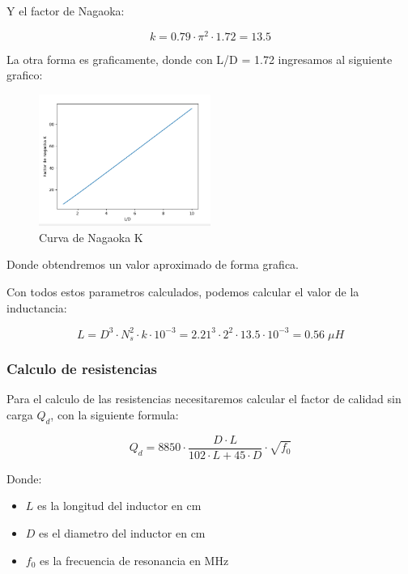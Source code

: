 Y el factor de Nagaoka:

\begin{equation}
    k = 0.79 \cdot \pi^2 \cdot 1.72 = 13.5
\end{equation}

La otra forma es graficamente, donde con L/D = 1.72 ingresamos al siguiente grafico:

\begin{figure}[h]
    \centering
    \includegraphics[width=0.5\textwidth]{Imagenes/factorNagaoka.png}
    \caption{Curva de Nagaoka K}
\end{figure}

Donde obtendremos un valor aproximado de forma grafica.

Con todos estos parametros calculados, podemos calcular el valor de la inductancia:

\begin{equation}
    L = D^3 \cdot N_s^2 \cdot k \cdot 10^{-3} = 2.21^3 \cdot 2^2 \cdot 13.5 \cdot 10^{-3} = 0.56\; \mu H
\end{equation}

\subsubsection{Calculo de resistencias}

Para el calculo de las resistencias necesitaremos calcular el factor de calidad sin carga $Q_d$, con la siguiente formula:

\begin{equation}
    Q_d = 8850 \cdot \frac{D \cdot L}{102 \cdot L + 45 \cdot D} \cdot \sqrt{f_0}
\end{equation}

Donde:

\begin{itemize}
    \item $L$ es la longitud del inductor en cm
    \item $D$ es el diametro del inductor en cm
    \item $f_0$ es la frecuencia de resonancia en MHz
\end{itemize}

